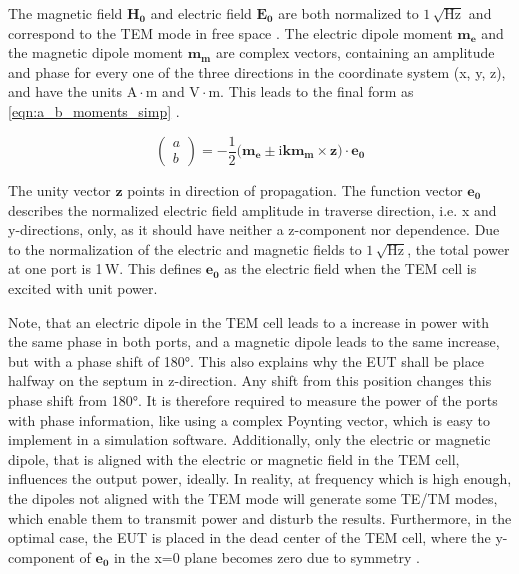 The magnetic field $\mathbf{H_0}$ and electric field $\mathbf{E_0}$ are both normalized to $1\,\sqrt{\mathrm{Hz}}$ \cite{Kreindl_Bauernfeind_Weiss_Stockreiter_Kaltenbacher_2024} and correspond to the TEM mode in free space \cite{Sreenivasiah_Chang_Ma_1981}. The electric dipole moment $\mathbf{m_e}$ and the magnetic dipole moment $\mathbf{m_m}$ are complex vectors, containing an amplitude and phase for every one of the three directions in the coordinate system (x, y, z), and have the units $\mathrm{A\cdot m}$ and $\mathrm{V\cdot m}$. This leads to the final form as \autoref{eqn:a_b_moments_simp} \cite{Sreenivasiah_Chang_Ma_1981}.

\begin{equation}
    \begin{pmatrix}a \\b\end{pmatrix} =-\frac{1}{2}(\mathbf{m_e\pm \mathrm{i}k\mathbf{m_m}\times \mathbf{z})\cdot \mathbf{e_0}}
    \label{eqn:a_b_moments_simp}
\end{equation}

The unity vector $\mathbf{z}$ points in direction of propagation. The function vector $\mathbf{e_0}$ describes the normalized electric field amplitude in traverse direction, i.e. x and y-directions, only, as it should have neither a z-component nor dependence. Due to the normalization of the electric and magnetic fields to $1\,\sqrt{\mathrm{Hz}}$, the total power at one port is 1\,W. This defines $\mathbf{e_0}$ as the electric field when the TEM cell is excited with unit power. 

Note, that an electric dipole in the TEM cell leads to a increase in power with the same phase in both ports, and a magnetic dipole leads to the same increase, but with a phase shift of 180°. This also explains why the EUT shall be place halfway on the septum in z-direction. Any shift from this position changes this phase shift from 180°. It is therefore required to measure the power of the ports with phase information, like using a complex Poynting vector, which is easy to implement in a simulation software. Additionally, only the electric or magnetic dipole, that is aligned with the electric or magnetic field in the TEM cell, influences the output power, ideally. In reality, at frequency which is high enough, the dipoles not aligned with the TEM mode will generate some TE/TM modes, which enable them to transmit power and disturb the results. Furthermore, in the optimal case, the EUT is placed in the dead center of the TEM cell, where the y-component of $\mathbf{e_0}$ in the x=0 plane becomes zero due to symmetry \cite{Sreenivasiah_Chang_Ma_1981}.


